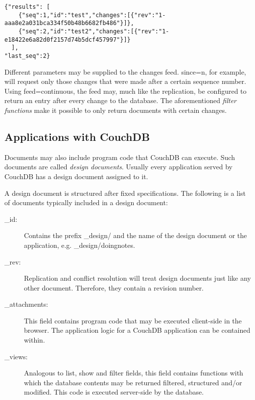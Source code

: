 \lstset{language=javascript}

\medskip
\begin{lstlisting}
{"results": [
    {"seq":1,"id":"test","changes":[{"rev":"1-aaa8e2a031bca334f50b48b6682fb486"}]},
    {"seq":2,"id":"test2","changes":[{"rev":"1-e18422e6a82d0f2157d74b5dcf457997"}]}
  ],
"last_seq":2}
\end{lstlisting}

Different parameters may be supplied to the changes feed. {\selectfont since=n}, for example, will request only those changes that were made after a certain sequence number. Using {\selectfont feed=continuous}, the feed may, much like the replication, be configured to return an entry after every change to the database. The aforementioned \textit{filter functions} make it possible to only return documents with certain changes.


\subsection{Applications with CouchDB}
\label{subsec:designdokumente}

Documents may also include program code that CouchDB can execute. Such documents are called \textit{design documents}. Usually every application served by CouchDB has a design document assigned to it.

A design document is structured after fixed specifications. The following is a list of documents typically included in a design document:

\begin{description}
  \item[\_id:] Contains the prefix {\selectfont \_design/} and the name of the design document or the application, e.g. {\selectfont \_design/doingnotes}.
  \item[\_rev:] Replication and conflict resolution will treat design documents just like any other document. Therefore, they contain a revision number.
  \item[\_attachments:] This field contains program code that may be executed client-side in the browser. The application logic for a CouchDB application can be contained within.
  \item[\_views:] Analogous to {\selectfont list}, {\selectfont show} and {\selectfont filter} fields, this field contains functions with which the database contents may be returned filtered, structured and/or modified. This code is executed server-side by the database.
\end{description}

